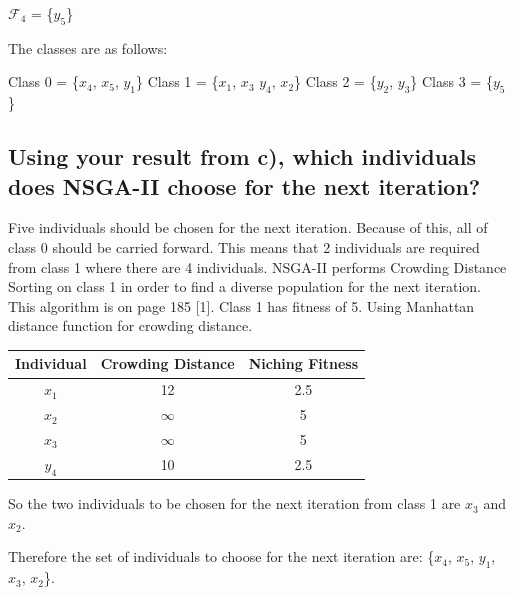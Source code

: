 \documentclass{article}
\begin{document}
\bigbreak

$\mathcal{F}_4$ = \{$y_5$\}

\bigbreak
The classes are as follows:
\bigbreak

Class 0 = \{$x_4$, $x_5$, $y_1$\}
\smallbreak
Class 1 = \{$x_1$, $x_3$ $y_4$, $x_2$\}
\smallbreak
Class 2 = \{$y_2$, $y_3$\}
\smallbreak
Class 3 = \{$y_5$\}

\subsection{Using your result from c), which individuals does NSGA-II choose for the next iteration?}

Five individuals should be chosen for the next iteration. Because of this, all of class 0 should be carried forward. This means that 2 individuals are required from class 1 where there are 4 individuals. NSGA-II performs Crowding Distance Sorting on class 1 in order to find a diverse population for the next iteration. This algorithm is on page 185 [1]. 
\bigbreak
Class 1 has fitness of 5.
\bigbreak
Using Manhattan distance function for crowding distance.
\smallbreak

\begin{center}
\begin{tabular}{ |c|c|c| } 
 \hline
 Individual & Crowding Distance & Niching Fitness \\
\hline
 $x_1$ & 12 & 2.5 \\ 
 \hline
 $x_2$ & $\infty$ & 5\\ 
 \hline
 $x_3$ & $\infty$ & 5\\ 
 \hline
 $y_4$ & 10 & 2.5 \\ 
 \hline
\end{tabular}
\end{center}

So the two individuals to be chosen for the next iteration from class 1 are $x_3$ and $x_2$.

\smallbreak

Therefore the set of individuals to choose for the next iteration are: \{$x_4$, $x_5$, $y_1$, $x_3$, $x_2$\}.
\end{document}
